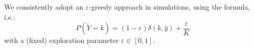 \documentclass[preprint,12pt,authoryear]{elsarticle}
\begin{document}

\vspace{.5cm} 
We consistently adopt an $\varepsilon$-greedy approach in simulations, using the \cite{kakade2008efficient} formula, i.e.:
$$P(\tilde{Y}=k) = (1-\varepsilon) \delta(k,\hat{y}) + \frac{\varepsilon}{K}$$ with a (fixed) exploration parameter $\varepsilon \in [0,1]$.
\end{document}
